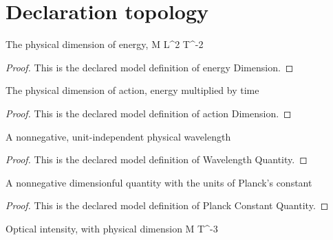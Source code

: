 \section{Declaration topology}
\begin{definition}
  \label{def:physics:phyx-mini-0537:phyxminiproblems-problemphyxmini0537-energydimension}
  The physical dimension of energy, M L\textasciicircum{}2 T\textasciicircum{}-2
\end{definition}
\begin{proof}
  This is the declared model definition of energy Dimension.
\end{proof}
\begin{definition}
  \label{def:physics:phyx-mini-0537:phyxminiproblems-problemphyxmini0537-actiondimension}
  The physical dimension of action, energy multiplied by time
\end{definition}
\begin{proof}
  This is the declared model definition of action Dimension.
\end{proof}
\begin{definition}
  \label{def:physics:phyx-mini-0537:phyxminiproblems-problemphyxmini0537-wavelengthquantity}
  A nonnegative, unit-independent physical wavelength
\end{definition}
\begin{proof}
  This is the declared model definition of Wavelength Quantity.
\end{proof}
\begin{definition}
  \label{def:physics:phyx-mini-0537:phyxminiproblems-problemphyxmini0537-planckconstantquantity}
  A nonnegative dimensionful quantity with the units of Planck's constant
\end{definition}
\begin{proof}
  This is the declared model definition of Planck Constant Quantity.
\end{proof}
\begin{definition}
  \label{def:physics:phyx-mini-0537:phyxminiproblems-problemphyxmini0537-opticalintensityquantity}
  Optical intensity, with physical dimension M T\textasciicircum{}-3
\end{definition}

